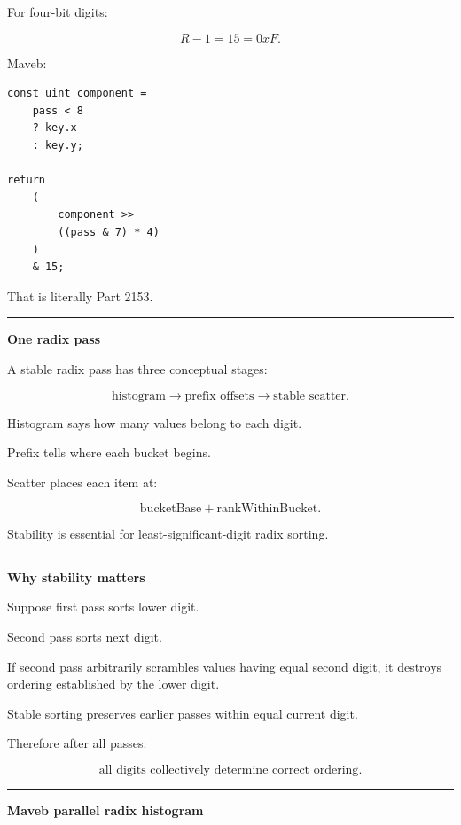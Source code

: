 For four-bit digits:

\[
R-1=15=0xF.
\]

Maveb:

\protect{}\label{ugtp35}%
\begin{verbatim}
const uint component =
    pass < 8
    ? key.x
    : key.y;

return
    (
        component >>
        ((pass & 7) * 4)
    )
    & 15;
\end{verbatim}

That is literally Part 2153.

\begin{center}\rule{0.5\linewidth}{0.5pt}\end{center}

\textbf{One radix pass}

A stable radix pass has three conceptual stages:

\[
\boxed{
\text{histogram}
\rightarrow
\text{prefix offsets}
\rightarrow
\text{stable scatter}.
}
\]

Histogram says how many values belong to each digit.

Prefix tells where each bucket begins.

Scatter places each item at:

\[
\text{bucketBase}
+
\text{rankWithinBucket}.
\]

Stability is essential for least-significant-digit radix sorting.

\begin{center}\rule{0.5\linewidth}{0.5pt}\end{center}

\textbf{Why stability matters}

Suppose first pass sorts lower digit.

Second pass sorts next digit.

If second pass arbitrarily scrambles values having equal second digit, it destroys ordering established by the lower digit.

Stable sorting preserves earlier passes within equal current digit.

Therefore after all passes:

\[
\boxed{\text{all digits collectively determine correct ordering}.}
\]

\begin{center}\rule{0.5\linewidth}{0.5pt}\end{center}

\textbf{Maveb parallel radix histogram}

